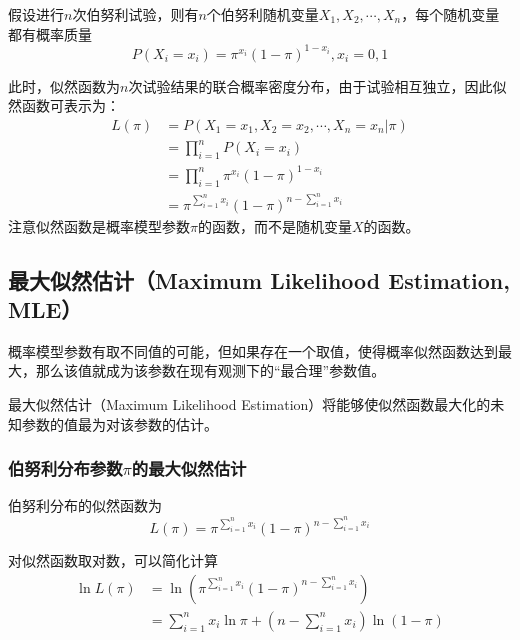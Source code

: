假设进行$n$次伯努利试验，则有$n$个伯努利随机变量$X_1,X_2,\cdots,X_n$，每个随机变量都有概率质量
\begin{equation}
    P(X_i = x_i) = \pi^{x_i}(1-\pi)^{1-x_i}, x_i = 0,1
\end{equation}

此时，似然函数为$n$次试验结果的联合概率密度分布，由于试验相互独立，因此似然函数可表示为：
\begin{equation}
    \begin{aligned}
        L(\pi) & = P(X_1 = x_1, X_2 = x_2, \cdots, X_n = x_n | \pi)                 \\
               & = \prod_{i=1}^n P(X_i = x_i)                                       \\
               & = \prod_{i=1}^n \pi^{x_i}(1-\pi)^{1-x_i}                           \\
               & = \pi^{\sum\limits_{i=1}^n x_i}(1-\pi)^{n-\sum\limits_{i=1}^n x_i}
    \end{aligned}
\end{equation}
注意似然函数是概率模型参数$\pi$的函数，而不是随机变量$X$的函数。

\subsection{最大似然估计（Maximum Likelihood Estimation, MLE）}

概率模型参数有取不同值的可能，但如果存在一个取值，使得概率似然函数达到最大，那么该值就成为该参数在现有观测下的“最合理”参数值。

最大似然估计（Maximum Likelihood Estimation）将能够使似然函数最大化的未知参数的值最为对该参数的估计。

\subsubsection{伯努利分布参数$\pi$的最大似然估计}

伯努利分布的似然函数为
\begin{equation}
    L(\pi) = \pi^{\sum_{i=1}^n x_i}(1-\pi)^{n-\sum_{i=1}^n x_i}
\end{equation}

对似然函数取对数，可以简化计算
\begin{equation}
    \begin{aligned}
        \ln L(\pi) & = \ln \left(\pi^{\sum_{i=1}^n x_i}(1-\pi)^{n-\sum_{i=1}^n x_i}\right) \\
                   & = \sum_{i=1}^n x_i \ln \pi + (n-\sum_{i=1}^n x_i)\ln(1-\pi)
    \end{aligned}
\end{equation}

